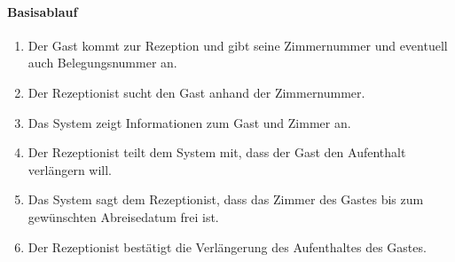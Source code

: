 \paragraph{Basisablauf}
\begin{enumerate}
\item Der \Gls{Gast} kommt zur \Gls{Rezeption} und gibt seine \Gls{Zimmernummer} und eventuell auch \Gls{Belegungsnummer} an.
\item Der \Gls{Rezeptionist} sucht den \Gls{Gast} anhand der \Gls{Zimmernummer}.
\item Das System zeigt Informationen zum \Gls{Gast} und \Gls{Zimmer} an.
\item Der \Gls{Rezeptionist} teilt dem System mit, dass der \Gls{Gast} den \Gls{Aufenthalt} verlängern will.
\item Das System sagt dem \Gls{Rezeptionist}, dass das \Gls{Zimmer} des \Gls{Gast}es bis zum gewünschten Abreisedatum frei ist.
\item Der \Gls{Rezeptionist} bestätigt die Verlängerung des Aufenthaltes des \Gls{Gast}es.
\end{enumerate}

